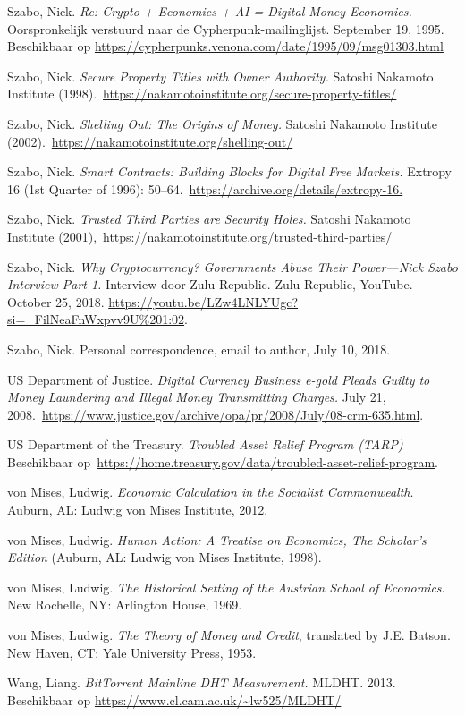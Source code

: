 \documentclass[
  a5paper,
  smalldemyvopaper,11pt,twoside,onecolumn,openright,extrafontsizes,
hidelinks]{memoir}
\begin{document}
Szabo, Nick. \emph{Re: Crypto + Economics + AI = Digital Money
Economies.} Oorspronkelijk verstuurd naar de Cypherpunk-mailinglijst.
September 19, 1995. Beschikbaar op
\url{https://cypherpunks.venona.com/date/1995/09/msg01303.html}

Szabo, Nick. \emph{Secure Property Titles with Owner Authority.} Satoshi
Nakamoto Institute
(1998).~\url{https://nakamotoinstitute.org/secure-property-titles/}

Szabo, Nick. \emph{Shelling Out: The Origins of Money.} Satoshi Nakamoto
Institute (2002).~\url{https://nakamotoinstitute.org/shelling-out/}

Szabo, Nick. \emph{Smart Contracts: Building Blocks for Digital Free
Markets.} Extropy 16 (1st Quarter of 1996):
50--64.~\url{https://archive.org/details/extropy-16.}

Szabo, Nick. \emph{Trusted Third Parties are Security Holes.} Satoshi
Nakamoto Institute
(2001),~\url{https://nakamotoinstitute.org/trusted-third-parties/}

Szabo, Nick. \emph{Why Cryptocurrency? Governments Abuse Their
Power---Nick Szabo Interview Part 1.} Interview door Zulu Republic. Zulu
Republic, YouTube. October 25, 2018.
\url{https://youtu.be/LZw4LNLYUgc?si=_FilNeaFnWxpvv9U\%201:02}.

Szabo, Nick. Personal correspondence, email to author, July 10, 2018.

US Department of Justice. \emph{Digital Currency Business e-gold Pleads
Guilty to Money Laundering and Illegal Money Transmitting Charges.} July
21,
2008.~\url{https://www.justice.gov/archive/opa/pr/2008/July/08-crm-635.html}.

US Department of the Treasury. \emph{Troubled Asset Relief Program
(TARP)} Beschikbaar
op~\url{https://home.treasury.gov/data/troubled-asset-relief-program}.

von Mises, Ludwig. \emph{Economic Calculation in the Socialist
Commonwealth}. Auburn, AL: Ludwig von Mises Institute, 2012.

von Mises, Ludwig. \emph{Human Action: A Treatise on Economics, The
Scholar's Edition} (Auburn, AL: Ludwig von Mises Institute, 1998).

von Mises, Ludwig. \emph{The Historical Setting of the Austrian School
of Economics}. New Rochelle, NY: Arlington House, 1969.

von Mises, Ludwig. \emph{The Theory of Money and Credit}, translated by
J.E. Batson. New Haven, CT: Yale University Press, 1953.

Wang, Liang. \emph{BitTorrent Mainline DHT Measurement.} MLDHT. 2013.
Beschikbaar op \url{https://www.cl.cam.ac.uk/~lw525/MLDHT/}
\end{document}
